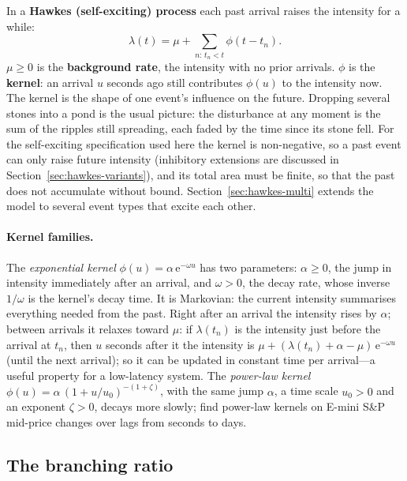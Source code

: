 In a \textbf{Hawkes (self-exciting) process} each past arrival raises the intensity for a while:
\[
  \lambda(t) = \mu + \sum_{n:\, t_n < t} \phi(t - t_n).
\]
$\mu \ge 0$ is the \textbf{background rate}, the intensity with no prior arrivals.
$\phi$ is the \textbf{kernel}: an arrival $u$ seconds ago still contributes $\phi(u)$ to the
intensity now. The kernel is the shape of one event's influence on the future. Dropping several
stones into a pond is the usual picture: the disturbance at any moment is the sum of the ripples
still spreading, each faded by the time since its stone fell. For the self-exciting specification
used here the kernel is non-negative, so a past event can only raise future intensity (inhibitory
extensions are discussed in Section~\ref{sec:hawkes-variants}), and its total area
must be finite, so that the past does not accumulate without bound. Section~\ref{sec:hawkes-multi}
extends the model to several event types that excite each other.

\paragraph{Kernel families.} The \emph{exponential kernel} $\phi(u) = \alpha\, \mathrm{e}^{-\omega u}$ has
two parameters: $\alpha \ge 0$, the jump in intensity immediately after an arrival, and
$\omega > 0$, the decay rate, whose inverse $1/\omega$ is the kernel's decay time. It is Markovian:
the current intensity summarises everything needed from the past. Right after an arrival the
intensity rises by $\alpha$; between arrivals it relaxes toward $\mu$: if $\lambda(t_n)$ is the intensity
just before the arrival at $t_n$, then $u$ seconds after it the intensity is
$\mu + (\lambda(t_n) + \alpha - \mu)\, \mathrm{e}^{-\omega u}$ (until the next arrival); so it can be updated in constant time per arrival---a useful
property for a low-latency system. The \emph{power-law kernel} $\phi(u) = \alpha\,(1 + u/u_0)^{-(1+\zeta)}$, with
the same jump $\alpha$, a time scale $u_0 > 0$ and an exponent $\zeta > 0$, decays more slowly; \citet{hardimanbercotbouchaud2013} find power-law kernels on
E-mini S\&P mid-price changes over lags from seconds to days.

\subsection{The branching ratio}
\label{sec:pp-branching}

